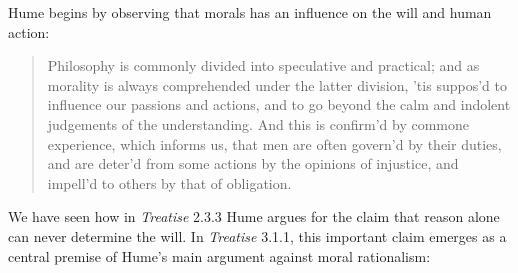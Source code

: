 
Hume begins by observing that morals has an influence on the will and human action:

\begin{quote}
    Philosophy is commonly divided into speculative and practical; and as morality is always comprehended under the latter division, 'tis suppos'd to influence our passions and actions, and to go beyond the calm and indolent judgements of the understanding. And this is confirm'd by commone experience, which informs us, that men are often govern'd by their duties, and are deter'd from some actions by the opinions of injustice, and impell'd to others by that of obligation.
\end{quote}

We have seen how in \emph{Treatise} 2.3.3 Hume argues for the claim that reason alone can never determine the will. In \emph{Treatise} 3.1.1, this important claim emerges as a central premise of Hume's main argument against moral rationalism:

